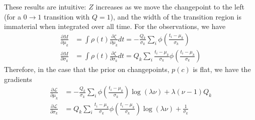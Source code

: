 \documentclass[11pt]{article}
\begin{document}
These results are intuitive: $Z$ increases as we move the changepoint to the left (for a $0 \rightarrow 1$ transition with $Q = 1$), and the width of the transition region is immaterial when integrated over all time. For the observations, we have
\begin{align}
    \frac{\partial M}{\partial \mu_k} &= \int \rho(t) \frac{\partial \zeta}{\partial \mu_k} dt = -\frac{Q_k}{\sigma_k}\sum_i \phi\left( \frac{t_i - \mu_k}{\sigma_k}\right) \\
    \frac{\partial M}{\partial \sigma_k} &= \int \rho(t) \frac{\partial \zeta}{\partial \sigma_k} dt = Q_k\sum_i \frac{t_i - \mu_k}{\sigma_k}\phi\left( \frac{t_i - \mu_k}{\sigma_k}\right)
\end{align}
Therefore, in the case that the prior on changepoints, $p(c)$ is flat, we have the gradients
\begin{align}
    \frac{\partial \mathcal{L}}{\partial \mu_k} &= -\frac{Q_k}{\sigma_k}\sum_i \phi\left( \frac{t_i - \mu_k}{\sigma_k}\right) \log (\lambda \nu)
    + \lambda (\nu - 1) Q_k \\
    \frac{\partial \mathcal{L}}{\partial \sigma_k} &=
    Q_k\sum_i \frac{t_i - \mu_k}{\sigma_k}\phi\left( \frac{t_i - \mu_k}{\sigma_k}\right) \log(\lambda \nu) + \frac{1}{\sigma_k}
\end{align}
\end{document}
